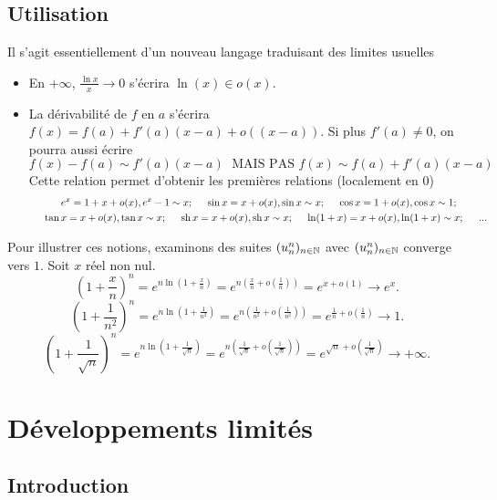 \subsection{Utilisation}
Il s'agit essentiellement d'un nouveau langage traduisant des limites usuelles
\begin{itemize}
  \item En $+\infty$, $\frac{\ln x}{x} \rightarrow 0$ s'écrira $\ln(x) \in o(x)$.
  \item La dérivabilité de $f$ en $a$ s'écrira $f(x) = f(a) + f'(a)(x-a) + o((x-a))$. Si plus $f'(a)\neq 0$, on pourra aussi écrire 
\begin{displaymath}
  f(x) - f(a) \sim f'(a)(x-a)\; \text{ MAIS PAS } f(x) \sim f(a) + f'(a)(x-a)
\end{displaymath}
Cette relation permet d'obtenir les premières relations (localement en $0$)
\begin{multline*}
 e^x = 1 + x + o(x), e^x - 1 \sim x; \hspace{0.5cm} \sin x = x + o(x), \sin x \sim x; \hspace{0.5cm} \cos x = 1 + o(x), \cos x \sim 1;\\
 \hspace{0.5cm} \tan x = x + o(x), \tan x \sim x ; \hspace{0.5cm} \mathop{\mathrm{sh}} x = x + o(x), \mathop{\mathrm{sh}} x \sim x;
 \hspace{0.5cm} \ln(1+ x) = x + o(x), \ln(1+ x) \sim x; \hspace{0.5cm} ...
\end{multline*}
\end{itemize}
Pour illustrer ces notions, examinons des suites $(u_n^n)_{n\in \mathbb{N}}$ avec $(u_n^n)_{n\in \mathbb{N}}$ converge vers $1$.
Soit $x$ réel non nul.
\[
(1+\frac{x}{n})^n = e^{n \ln(1 + \frac{x}{n})} = e^{n\left(\frac{x}{n} + o(\frac{1}{n}) \right)} = e^{ x + o(1)} \rightarrow e^x. 
\]
\[
(1+\frac{1}{n^2})^n = e^{n \ln(1 + \frac{1}{n^2})} = e^{n\left(\frac{1}{n^2} + o(\frac{1}{n^2}) \right)} = e^{ \frac{1}{n} + o(\frac{1}{n})} \rightarrow 1. 
\]
\[
(1+\frac{1}{\sqrt{n}})^n = e^{n \ln(1 + \frac{1}{\sqrt{n}})} = e^{n\left(\frac{1}{\sqrt{n}} + o(\frac{1}{\sqrt{n}}) \right)} = e^{ \sqrt{n} + o(\frac{1}{\sqrt{n}})} \rightarrow +\infty. 
\]


\section{Développements limités}
\subsection{Introduction}
